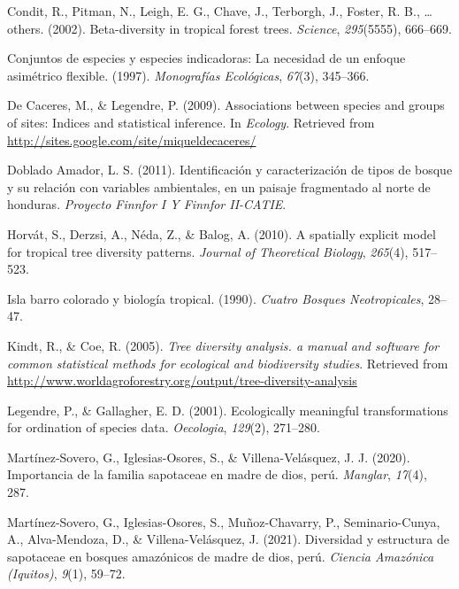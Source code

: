 \documentclass[11pt,]{article}
\begin{document}
\hypertarget{ref-condit2002beta}{}
Condit, R., Pitman, N., Leigh, E. G., Chave, J., Terborgh, J., Foster,
R. B., \ldots{} others. (2002). Beta-diversity in tropical forest trees.
\emph{Science}, \emph{295}(5555), 666--669.

\hypertarget{ref-dufrene1997species}{}
Conjuntos de especies y especies indicadoras: La necesidad de un enfoque
asimétrico flexible. (1997). \emph{Monografías Ecológicas},
\emph{67}(3), 345--366.

\hypertarget{ref-indicspecies}{}
De Caceres, M., \& Legendre, P. (2009). Associations between species and
groups of sites: Indices and statistical inference. In \emph{Ecology}.
Retrieved from \url{http://sites.google.com/site/miqueldecaceres/}

\hypertarget{ref-doblado2011identificacion}{}
Doblado Amador, L. S. (2011). Identificación y caracterización de tipos
de bosque y su relación con variables ambientales, en un paisaje
fragmentado al norte de honduras. \emph{Proyecto Finnfor I Y Finnfor
II-CATIE}.

\hypertarget{ref-horvat2010spatially}{}
Horvát, S., Derzsi, A., Néda, Z., \& Balog, A. (2010). A spatially
explicit model for tropical tree diversity patterns. \emph{Journal of
Theoretical Biology}, \emph{265}(4), 517--523.

\hypertarget{ref-leigh1990barro}{}
Isla barro colorado y biología tropical. (1990). \emph{Cuatro Bosques
Neotropicales}, 28--47.

\hypertarget{ref-diversityanalysis}{}
Kindt, R., \& Coe, R. (2005). \emph{Tree diversity analysis. a manual
and software for common statistical methods for ecological and
biodiversity studies}. Retrieved from
\url{http://www.worldagroforestry.org/output/tree-diversity-analysis}

\hypertarget{ref-legendre2001ecologically}{}
Legendre, P., \& Gallagher, E. D. (2001). Ecologically meaningful
transformations for ordination of species data. \emph{Oecologia},
\emph{129}(2), 271--280.

\hypertarget{ref-martinez2020importancia}{}
Martínez-Sovero, G., Iglesias-Osores, S., \& Villena-Velásquez, J. J.
(2020). Importancia de la familia sapotaceae en madre de dios, perú.
\emph{Manglar}, \emph{17}(4), 287.

\hypertarget{ref-martinez2021diversidad}{}
Martínez-Sovero, G., Iglesias-Osores, S., Muñoz-Chavarry, P.,
Seminario-Cunya, A., Alva-Mendoza, D., \& Villena-Velásquez, J. (2021).
Diversidad y estructura de sapotaceae en bosques amazónicos de madre de
dios, perú. \emph{Ciencia Amazónica (Iquitos)}, \emph{9}(1), 59--72.
\end{document}
